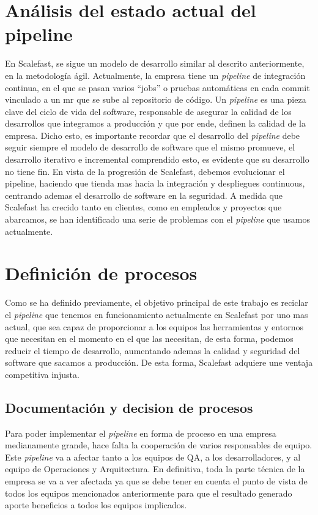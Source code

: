 \documentclass[12pt]{report} %
\begin{document}
\section{Análisis del estado actual del pipeline} %

En Scalefast, se sigue un modelo de desarrollo similar al descrito
anteriormente, en la metodología ágil.  Actualmente, la empresa tiene un
\textit{\gls{pipeline}} de integración continua, en el que se pasan varios
``jobs'' o pruebas automáticas en cada commit vinculado a un \acrfull{mr} que se
sube al repositorio de código.  Un \textit{\gls{pipeline}} es una pieza clave
del ciclo de vida del software, responsable de asegurar la calidad de los
desarrollos que integramos a producción y que por ende, definen la calidad de la
empresa.  Dicho esto, es importante recordar que el desarrollo del
\textit{\gls{pipeline}} debe seguir siempre el modelo de desarrollo de software
que el mismo promueve, el desarrollo iterativo e incremental comprendido esto,
es evidente que su desarrollo no tiene fin.  En vista de la progresión de
Scalefast, debemos evolucionar el pipeline, haciendo que tienda mas hacia la
integración y despliegues continuous, centrando ademas el desarrollo de software
en la seguridad.  A medida que Scalefast ha crecido tanto en clientes, como en
empleados y proyectos que abarcamos, se han identificado una serie de problemas
con el \textit{\gls{pipeline}} que usamos actualmente.

\section{Definición de procesos}

Como se ha definido previamente, el objetivo principal de este trabajo es
reciclar el \textit{\gls{pipeline}} que tenemos en funcionamiento actualmente en
Scalefast por uno mas actual, que sea capaz de proporcionar a los equipos las
herramientas y entornos que necesitan en el momento en el que las necesitan, de
esta forma, podemos reducir el tiempo de desarrollo, aumentando ademas la
calidad y seguridad del software que sacamos a producción.  De esta forma,
Scalefast adquiere une ventaja competitiva injusta.

\subsection{Documentación y decision de procesos}

Para poder implementar el \textit{\gls{pipeline}} en forma de proceso en una
empresa medianamente grande, hace falta la cooperación de varios responsables de
equipo.  Este \textit{\gls{pipeline}} va a afectar tanto a los equipos de QA, a
los desarrolladores, y al equipo de Operaciones y Arquitectura.  En definitiva,
toda la parte técnica de la empresa se va a ver afectada ya que se debe tener en
cuenta el punto de vista de todos los equipos mencionados anteriormente para que
el resultado generado aporte beneficios a todos los equipos implicados.
\end{document}
